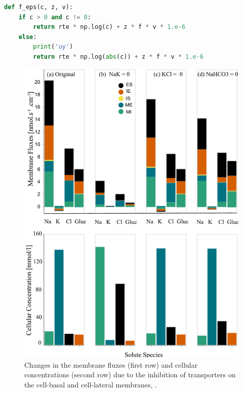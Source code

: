 \documentclass[fleqn,10pt]{physiome}
\begin{document}
\begin{lstlisting}[language=python]
def f_eps(c, z, v):    
    if c > 0 and c != 0: 
        return rte * np.log(c) + z * f * v * 1.e-6
    else:
        print('uy')
        return rte * np.log(abs(c)) + z * f * v * 1.e-6
\end{lstlisting}

\newpage
\begin{figure}[h!]
\includegraphics[width=1\linewidth]{Figure6.pdf}
\centering
\caption{Changes in the membrane fluxes (first row) and cellular concentrations (second row) due to the inhibition of transporters on the cell-basal and cell-lateral membranes, \cite[Figure 6]{noroozbabaee2022modular}.}
\label{fig:Figure6}
\end{figure}
\end{document}
